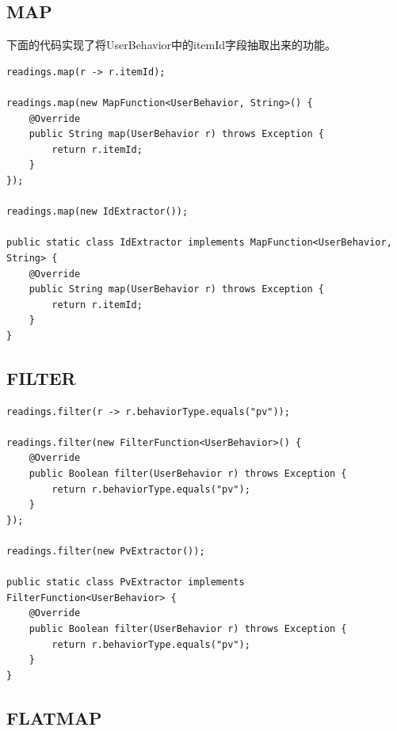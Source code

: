 \documentclass[cn,11pt,chinese]{elegantbook}
\begin{document}
\subsection{MAP}

下面的代码实现了将UserBehavior中的itemId字段抽取出来的功能。

\begin{verbatim}
readings.map(r -> r.itemId);

readings.map(new MapFunction<UserBehavior, String>() {
    @Override
    public String map(UserBehavior r) throws Exception {
        return r.itemId;
    }
});

readings.map(new IdExtractor());
    
public static class IdExtractor implements MapFunction<UserBehavior, String> {
    @Override
    public String map(UserBehavior r) throws Exception {
        return r.itemId;
    }
}
\end{verbatim}

\subsection{FILTER}

\begin{verbatim}
readings.filter(r -> r.behaviorType.equals("pv"));
    
readings.filter(new FilterFunction<UserBehavior>() {
    @Override
    public Boolean filter(UserBehavior r) throws Exception {
        return r.behaviorType.equals("pv");
    }
});
    
readings.filter(new PvExtractor());
    
public static class PvExtractor implements FilterFunction<UserBehavior> {
    @Override
    public Boolean filter(UserBehavior r) throws Exception {
        return r.behaviorType.equals("pv");
    }
}
\end{verbatim}

\subsection{FLATMAP}
\end{document}
